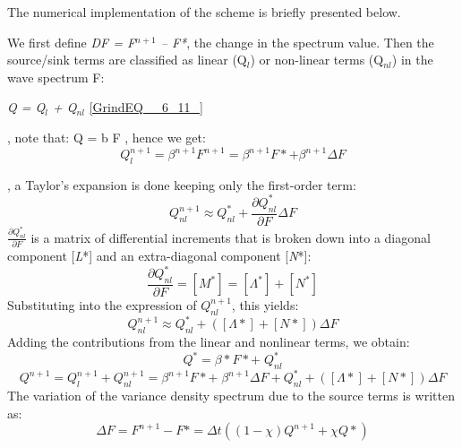  The numerical implementation of the scheme is briefly presented below.

 We first define \textit{DF = F${}^{n+1}$ -- F*}, the change in the spectrum value. Then the source/sink terms are classified as linear (Q${}_{l}$) or non-linear terms (Q${}_{nl}$) in the wave spectrum F:

\textit{Q = Q${}_{l}$ + Q${}_{nl}$} \eqref{GrindEQ__6_11_}

 , note that: Q = b F , hence we get:
\begin{equation} \label{GrindEQ__6_12_}
Q_{l}^{n+1} =\beta ^{n+1} F^{n+1} =\beta ^{n+1} F*+\beta ^{n+1} \Delta F
\end{equation}

 , a Taylor's expansion is done keeping only the first-order term:
\begin{equation} \label{GrindEQ__6_13_}
Q_{nl}^{n+1} \approx Q_{nl}^{*} +\frac{\partial Q_{nl}^{*} }{\partial F} \Delta F
\end{equation}
$\frac{\partial Q_{nl}^{*} }{\partial F} $ is a matrix of differential increments that is broken down into a diagonal component [\textit{L}*] and an extra-diagonal component [\textit{N}*]:
\begin{equation} \label{GrindEQ__6_14_}
\frac{\partial Q_{nl}^{*} }{\partial F} =\left[M^{*} \right]=\left[\Lambda ^{*} \right]+\left[N^{*} \right]
\end{equation}
Substituting into the expression of $Q_{nl}^{n+1} $, this yields:
\begin{equation} \label{GrindEQ__6_15_}
Q_{nl}^{n+1} \approx Q_{nl}^{*} +\left(\left[\Lambda *\right]+\left[N*\right]\right)\Delta F
\end{equation}
Adding the contributions from the linear and nonlinear terms, we obtain:
\begin{equation} \label{GrindEQ__6_16_}
Q_{}^{*} =\beta *F*+\; Q_{nl}^{*}
\end{equation}
\begin{equation} \label{GrindEQ__6_17_}
Q_{}^{n+1} =Q_{l}^{n+1} +Q_{nl}^{n+1} =\beta ^{n+1} F*+\; \beta ^{n+1} \Delta F+Q_{nl}^{*} +\left(\left[\Lambda *\right]+\left[N*\right]\right)\Delta F
\end{equation}
The variation of the variance density spectrum due to the source terms is written as:
\begin{equation} \label{GrindEQ__6_18_}
\Delta F=F^{n+1} -F*=\Delta t\left((1-\chi )Q^{n+1} +\chi Q*\right)
\end{equation}
